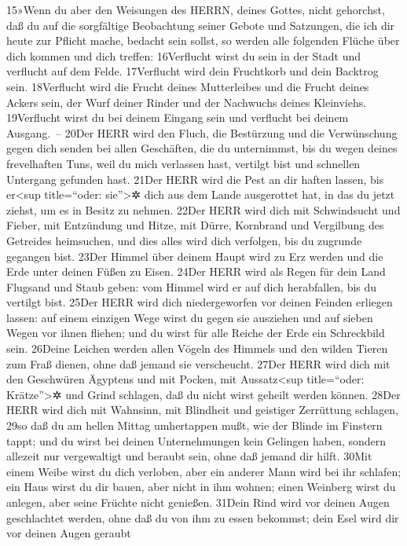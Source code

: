 15»Wenn du aber den Weisungen des HERRN, deines Gottes, nicht gehorchst,
daß du auf die sorgfältige Beobachtung seiner Gebote und Satzungen, die
ich dir heute zur Pflicht mache, bedacht sein sollst, so werden alle
folgenden Flüche über dich kommen und dich treffen: 16Verflucht wirst du
sein in der Stadt und verflucht auf dem Felde. 17Verflucht wird dein
Fruchtkorb und dein Backtrog sein. 18Verflucht wird die Frucht deines
Mutterleibes und die Frucht deines Ackers sein, der Wurf deiner Rinder
und der Nachwuchs deines Kleinviehs. 19Verflucht wirst du bei deinem
Eingang sein und verflucht bei deinem Ausgang.~-- 20Der HERR wird den
Fluch, die Bestürzung und die Verwünschung gegen dich senden bei allen
Geschäften, die du unternimmst, bis du wegen deines frevelhaften Tuns,
weil du mich verlassen hast, vertilgt bist und schnellen Untergang
gefunden hast. 21Der HERR wird die Pest an dir haften lassen, bis
er\textless sup title=``oder: sie''\textgreater✲ dich aus dem Lande
ausgerottet hat, in das du jetzt ziehst, um es in Besitz zu nehmen.
22Der HERR wird dich mit Schwindsucht und Fieber, mit Entzündung und
Hitze, mit Dürre, Kornbrand und Vergilbung des Getreides heimsuchen, und
dies alles wird dich verfolgen, bis du zugrunde gegangen bist. 23Der
Himmel über deinem Haupt wird zu Erz werden und die Erde unter deinen
Füßen zu Eisen. 24Der HERR wird als Regen für dein Land Flugsand und
Staub geben: vom Himmel wird er auf dich herabfallen, bis du vertilgt
bist. 25Der HERR wird dich niedergeworfen vor deinen Feinden erliegen
lassen: auf einem einzigen Wege wirst du gegen sie ausziehen und auf
sieben Wegen vor ihnen fliehen; und du wirst für alle Reiche der Erde
ein Schreckbild sein. 26Deine Leichen werden allen Vögeln des Himmels
und den wilden Tieren zum Fraß dienen, ohne daß jemand sie verscheucht.
27Der HERR wird dich mit den Geschwüren Ägyptens und mit Pocken, mit
Aussatz\textless sup title=``oder: Krätze''\textgreater✲ und Grind
schlagen, daß du nicht wirst geheilt werden können. 28Der HERR wird dich
mit Wahnsinn, mit Blindheit und geistiger Zerrüttung schlagen, 29so daß
du am hellen Mittag umhertappen mußt, wie der Blinde im Finstern tappt;
und du wirst bei deinen Unternehmungen kein Gelingen haben, sondern
allezeit nur vergewaltigt und beraubt sein, ohne daß jemand dir hilft.
30Mit einem Weibe wirst du dich verloben, aber ein anderer Mann wird bei
ihr schlafen; ein Haus wirst du dir bauen, aber nicht in ihm wohnen;
einen Weinberg wirst du anlegen, aber seine Früchte nicht genießen.
31Dein Rind wird vor deinen Augen geschlachtet werden, ohne daß du von
ihm zu essen bekommst; dein Esel wird dir vor deinen Augen geraubt
